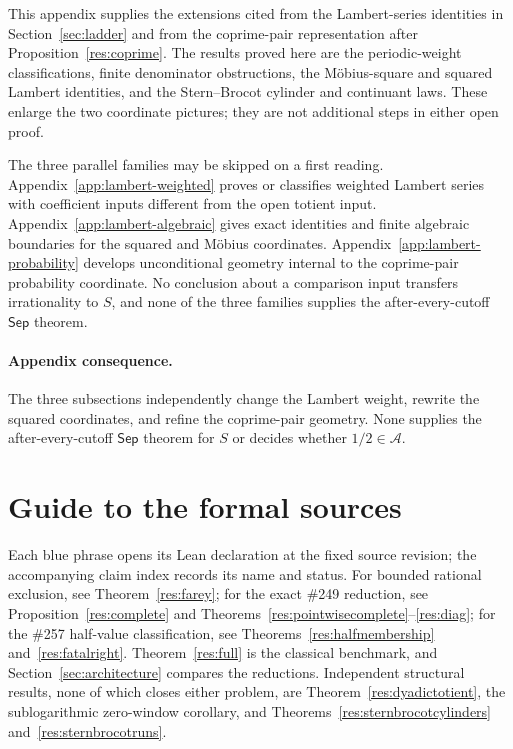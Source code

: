 \documentclass[11pt]{article}
\theoremstyle{definition}
\theoremstyle{remark}
\begin{document}
This appendix supplies the extensions cited from the Lambert-series identities
in Section~\ref{sec:ladder} and from the coprime-pair representation after
Proposition~\ref{res:coprime}.  The results proved here are the periodic-weight
classifications, finite denominator obstructions, the M\"obius-square and squared
Lambert identities, and the Stern--Brocot cylinder and continuant laws.
These enlarge the two coordinate pictures; they are not additional steps in
either open proof.

The three parallel families may be skipped on a first reading.
Appendix~\ref{app:lambert-weighted} proves or classifies weighted Lambert
series with coefficient inputs different from the open totient input.
Appendix~\ref{app:lambert-algebraic} gives exact identities and finite
algebraic boundaries for the squared and M\"obius coordinates.
Appendix~\ref{app:lambert-probability} develops unconditional geometry
internal to the coprime-pair probability coordinate.
No conclusion about a comparison input transfers irrationality to \(S\), and
none of the three families supplies the after-every-cutoff
\(\mathsf{Sep}\) theorem.

\FurtherLambertAppendix

\paragraph{Appendix consequence.}
The three subsections independently change the Lambert weight, rewrite the
squared coordinates, and refine the coprime-pair geometry.  None supplies the
after-every-cutoff \(\mathsf{Sep}\) theorem for \(S\) or decides whether \(1/2\in\mathcal A\).

\section{Guide to the formal sources}\label{app:index}

Each blue phrase opens its Lean declaration at the fixed source revision; the
accompanying claim index records its name and status.  For bounded rational
exclusion, see Theorem~\ref{res:farey}; for the exact \#249 reduction, see
Proposition~\ref{res:complete} and Theorems~\ref{res:pointwisecomplete}--\ref{res:diag};
for the \#257 half-value classification, see Theorems~\ref{res:halfmembership}
and~\ref{res:fatalright}.  Theorem~\ref{res:full} is the classical benchmark,
and Section~\ref{sec:architecture} compares the reductions.  Independent
structural results, none of which closes either problem, are
Theorem~\ref{res:dyadictotient}, the sublogarithmic zero-window corollary, and
Theorems~\ref{res:sternbrocotcylinders} and~\ref{res:sternbrocotruns}.
\end{document}
